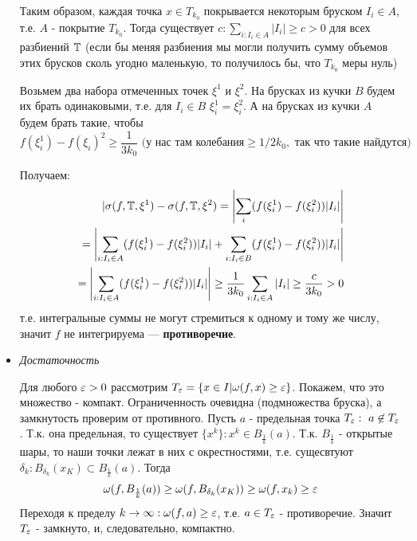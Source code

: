 \documentclass[a4paper]{article}
\begin{document}
\begin{itemize}
    Таким образом, каждая точка $x\in T_{k_0}$ покрывается некоторым бруском $I_i \in A$, т.е. $A$ - покрытие $T_{k_0}$. Тогда существует $c: \displaystyle\sum_{i:I_i\in A}|I_i| \ge c > 0$ для всех разбиений $\operatorname{\mathbb{T}}$ (если бы меняя разбиения мы могли получить сумму объемов этих брусков сколь угодно маленькую, то получилось бы, что $T_{k_0}$ меры нуль)

    Возьмем два набора отмеченных точек $\xi^1$ и $\xi^2$. На брусках из кучки $B$ будем их брать одинаковыми, т.е. для $I_i\in B \,\, \xi_i^1 = \xi_i^2$. А на брусках из кучки $A$ будем брать такие, чтобы 
    \begin{equation*}
        f(\xi_i^1) - f(\xi_i)^2 \ge \frac{1}{3k_0} \text{ (у нас там колебания} \ge 1/2k_0, \text{ так что такие найдутся)}
    \end{equation*}

    Получаем:
    \begin{equation*}
        \begin{aligned}
            |\sigma(f, \T, \xi^1) - \sigma(f, \T, \xi^2) 
            = \left|\sum_i(f(\xi_i^1) - f(\xi_i^2))|I_i|\right|\\
            = \left|\sum_{i: I_i\in A}(f(\xi_i^1) - f(\xi_i^2))|I_i| + \sum_{i:I_i\in B}(f(\xi_i^1) - f(\xi_i^2))|I_i|\right|\\
            = \left|\sum_{i: I_i\in A} (f(\xi_i^1) - f(\xi_i^2))|I_i|\right| \ge \frac{1}{3k_0} \sum_{i:I_i\in A}|I_i| \ge \frac{c}{3k_0} > 0
        \end{aligned}
    \end{equation*}
    т.е. интегральные суммы не могут стремиться к одному и тому же числу, значит $f$ не интегрируема --- \textbf{противоречие}.

    \item \textit{Достаточность}

    Для любого $\operatorname{\varepsilon} > 0$ рассмотрим $T_{\operatorname{\varepsilon}} = \{x\in I| \omega(f, x) \ge \operatorname{\varepsilon}\}$. Покажем, что это множество - компакт. Ограниченность очевидна (подмножества бруска), а замкнутость проверим от противного. Пусть $a$ - предельная точка $T_{\operatorname{\varepsilon}}: \,\, a\not\in T_{\operatorname{\varepsilon}}$. Т.к. она предельная, то существует $\{x^k\}: x^k \in B_{\frac{1}{k}}(a)$. Т.к. $B_{\frac{1}{k}}$ - открытые шары, то наши точки лежат в них с окрестностями, т.е. сущесвтуют $\delta_k : B_{\delta_k}(x_K) \subset B_{\frac{1}{k}}(a)$. Тогда
    \begin{equation*}
        \omega(f, B_{\frac{1}{k}}(a)) \ge \omega(f, B_{\delta_k}(x_K)) \ge \omega(f, x_k) \ge \operatorname{\varepsilon}
    \end{equation*}
    Переходя к пределу $k\to\infty : \omega(f, a) \ge \operatorname{\varepsilon}$, т.е. $a\in T_{\operatorname{\varepsilon}}$ - противоречие. Значит $T_{\operatorname{\varepsilon}}$ - замкнуто, и, следовательно, компактно.


\end{itemize}
\end{document}
